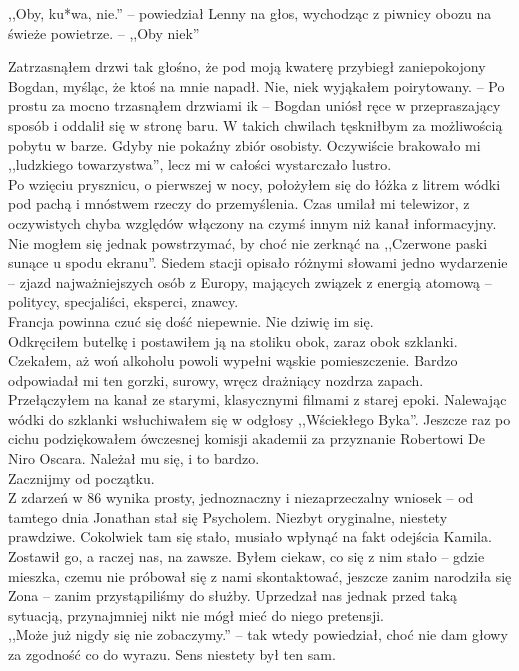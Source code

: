 \documentclass[../MAIN.tex]{subfiles}
\begin{document}
,,Oby, ku*wa, nie.'' -- powiedział Lenny na głos, wychodząc z piwnicy obozu na świeże powietrze. -- ,,Oby nie\3k''

Zatrzasnąłem drzwi tak głośno, że pod moją kwaterę przybiegł zaniepokojony Bogdan, myśląc, że ktoś na mnie napadł.
\sx Nie, nie\3k wyjąkałem poirytowany. -- Po prostu za mocno trzasnąłem drzwiami i\3k -- Bogdan uniósł ręce w przepraszający sposób i oddalił się w stronę baru.
\qd
W takich chwilach tęskniłbym za możliwością pobytu w barze. Gdyby nie pokaźny zbiór osobisty. Oczywiście brakowało mi ,,ludzkiego towarzystwa'', lecz mi w całości wystarczało lustro.\\
Po wzięciu prysznicu, o pierwszej w nocy, położyłem się do łóżka z litrem wódki pod pachą i mnóstwem rzeczy do przemyślenia. Czas umilał mi telewizor, z oczywistych chyba względów włączony na czymś innym niż kanał informacyjny. Nie mogłem się jednak powstrzymać, by choć nie zerknąć na ,,Czerwone paski sunące u spodu ekranu''. Siedem stacji opisało różnymi słowami jedno wydarzenie -- zjazd najważniejszych osób z Europy, mających związek z energią atomową -- politycy, specjaliści, eksperci, znawcy.\\
Francja powinna czuć się dość niepewnie. Nie dziwię im się.\\
Odkręciłem butelkę i postawiłem ją na stoliku obok, zaraz obok szklanki. Czekałem, aż woń alkoholu powoli wypełni wąskie pomieszczenie. Bardzo odpowiadał mi ten gorzki, surowy, wręcz drażniący nozdrza zapach.\\
Przełączyłem na kanał ze starymi, klasycznymi filmami z starej epoki. Nalewając wódki do szklanki wsłuchiwałem się w odgłosy ,,Wściekłego Byka''. Jeszcze raz po cichu podziękowałem ówczesnej komisji akademii za przyznanie Robertowi De Niro Oscara. Należał mu się, i to bardzo.\\
Zacznijmy od początku.\\
Z zdarzeń w 86 wynika prosty, jednoznaczny i niezaprzeczalny wniosek -- od tamtego dnia Jonathan stał się Psycholem. Niezbyt oryginalne, niestety prawdziwe. Cokolwiek tam się stało, musiało wpłynąć na fakt odejścia Kamila. Zostawił go, a raczej nas, na zawsze. Byłem ciekaw, co się z nim stało -- gdzie mieszka, czemu nie próbował się z nami skontaktować, jeszcze zanim narodziła się Zona -- zanim przystąpiliśmy do służby. Uprzedzał nas jednak przed taką sytuacją, przynajmniej nikt nie mógł mieć do niego pretensji.\\
,,Może już nigdy się nie zobaczymy.'' -- tak wtedy powiedział, choć nie dam głowy za zgodność co do wyrazu. Sens niestety był ten sam.\\
\end{document}
